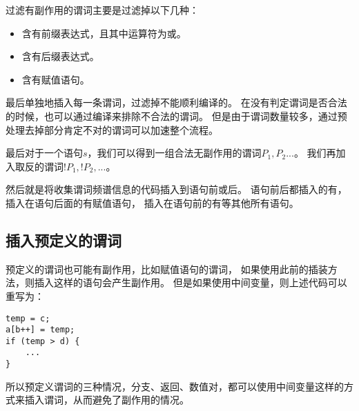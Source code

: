 过滤有副作用的谓词主要是过滤掉以下几种：
\begin{itemize}
\item 含有前缀表达式，且其中运算符为\mycode{++}或\mycode{--}。
\item 含有后缀表达式。
\item 含有赋值语句。
\end{itemize}

最后单独地插入每一条谓词，过滤掉不能顺利编译的。
在没有判定谓词是否合法的时候，也可以通过编译来排除不合法的谓词。
但是由于谓词数量较多，通过预处理去掉部分肯定不对的谓词可以加速整个流程。

最后对于一个语句$s$，我们可以得到一组合法无副作用的谓词${P_1,P_2...}$。
我们再加入取反的谓词${!P_1, !P_2, ...}$。

然后就是将收集谓词频谱信息的代码插入到语句前或后。
语句前后都插入的有，
插入在语句后面的有赋值语句，
插入在语句前的有等其他所有语句。


\subsection{插入预定义的谓词}

预定义的谓词也可能有副作用，比如赋值语句的谓词，
如果使用此前的插装方法，则插入这样的语句会产生副作用。
但是如果使用中间变量，则上述代码可以重写为：
\lstset{language=Java}
\begin{lstlisting}
temp = c;
a[b++] = temp;
if (temp > d) {
    ...
}
\end{lstlisting}
所以预定义谓词的三种情况，分支、返回、数值对，都可以使用中间变量这样的方式来插入谓词，从而避免了副作用的情况。

